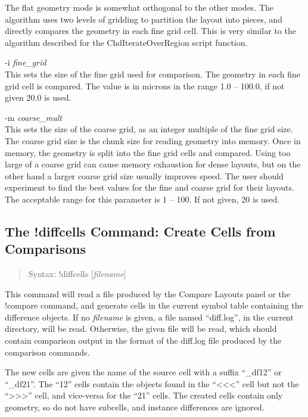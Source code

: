 The flat geometry mode is somewhat orthogonal to the other modes.  The
algorithm uses two levels of gridding to partition the layout into
pieces, and directly compares the geometry in each fine grid cell. 
This is very similar to the algorithm described for the {\vt
ChdIterateOverRegion} script function.

\begin{description}
\item{{\vt -i} {\it fine\_grid}}\\
This sets the size of the fine grid used for comparison.  The geometry
in each fine grid cell is compared.  The value is in microns in the
range 1.0 -- 100.0, if not given 20.0 is used.

\item{{\vt -m} {\it coarse\_mult}}\\
This sets the size of the coarse grid, as an integer multiple of the
fine grid size.  The coarse grid size is the chunk size for reading
geometry into memory.  Once in memory, the geometry is split into the
fine grid cells and compared.  Using too large of a coarse grid can
cause memory exhaustion for dense layouts, but on the other hand a
larger coarse grid size usually improves speed.  The user should
experiment to find the best values for the fine and coarse grid for
their layouts.  The acceptable range for this parameter is 1 -- 100. 
If not given, 20 is used.
\end{description}

\subsection{The {\cb !diffcells} Command: Create Cells from Comparisons}
\begin{quote}
Syntax: {\vt !diffcells} [{\it filename\/}]
\end{quote}
This command will read a file produced by the {\cb Compare Layouts}
panel or the {\cb !compare} command, and generate cells in the current
symbol table containing the difference objects.  If no {\it filename}
is given, a file named ``{\vt diff.log}'', in the current directory,
will be read.  Otherwise, the given file will be read, which should
contain comparison output in the format of the {\vt diff.log} file
produced by the comparison commands.

The new cells are given the name of the source cell with a suffix
``{\vt \_df12}'' or ``{\vt \_df21}''.  The ``12'' cells contain the
objects found in the ``{\vt <<<}'' cell but not the ``{\vt >>>}''
cell, and vice-versa for the ``21'' cells.  The created cells contain
only geometry, so do not have subcells, and instance differences are
ignored. 

